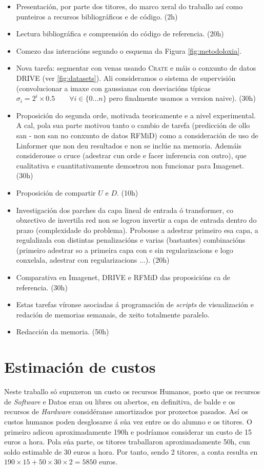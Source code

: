 \begin{itemize}
			\item Presentación, por parte dos titores, do marco xeral do traballo así como punteiros a recursos bibliográficos e de código. (2h)
			\item Lectura bibliográfica e comprensión do código de referencia. (20h)
			\item Comezo das interacións segundo o esquema da Figura \ref{fig:metodoloxia}.
			\item Nova tarefa: segmentar con venas usando \textsc{Crate} e máis o conxunto de datos DRIVE (ver \ref{fig:datasets}). Ali consideramos o  sistema de supervisión (convolucionar a imaxe con gaussianas con desviacións típicas $\sigma_i = 2^{i} \times 0.5 \qquad \forall i\in \{0 \dots n\}$ pero finalmente usamos a version naive). (30h)
			\item Proposición do segunda orde, motivada teoricamente e a nivel experimental. A cal, pola sua parte motivou tanto o cambio de tarefa (predicción de ollo san - non san no conxunto de datos RFMiD) como a consideración de uso de Linformer que non deu resultados e non se inclúe na memoria. Ademáis considerouse o cruce (adestrar cun orde e facer inferencia con outro), que cualitativa e cuantitativamente demostrou non funcionar para Imagenet. (30h)
			\item Proposición de compartir $U$ e $D$. (10h)
			\item Investigación dos parches da capa lineal de entrada ó transformer, co obxectivo de invertila red non se logrou invertir a capa de entrada dentro do prazo (complexidade do problema). Probouse a adestrar primeiro esa capa, a regulalizala con distintas penalizacións e varias (bastantes) combinacións (primeiro adestrar so a primeira capa con e sin regularizacions e logo conxelala, adestrar con regularizacions $\dots$). (20h)
			\item Comparativa en Imagenet, DRIVE e RFMiD das proposicións ca de referencia. (30h)
			\item Estas tarefas víronse asociadas á programación de \emph{scripts} de visualización e redación de memorias semanais, de xeito totalmente paralelo.
			\item Redacción da memoria. (50h)
\end{itemize}

\section{Estimación de custos}

Neste traballo só supuxeron un custo os recursos Humanos, posto que os recursos de \emph{Software} e Datos eran ou libres ou abertos, en definitiva, de balde e os recursos de \emph{Hardware} considéranse amortizados por proxectos pasados. Así os custos humanos poden desglosarse á súa vez entre os do alumno e os titores. O primeiro adicou aproximadamente 190h e podríamos considerar un custo de 15 euros a hora. Pola súa parte, os titores traballaron aproximadamente 50h, cun soldo estimable de 30 euros a hora. Por tanto, sendo 2 titores, a conta resulta en $190\times 15 + 50 \times 30 \times 2 = 5850$ euros.
